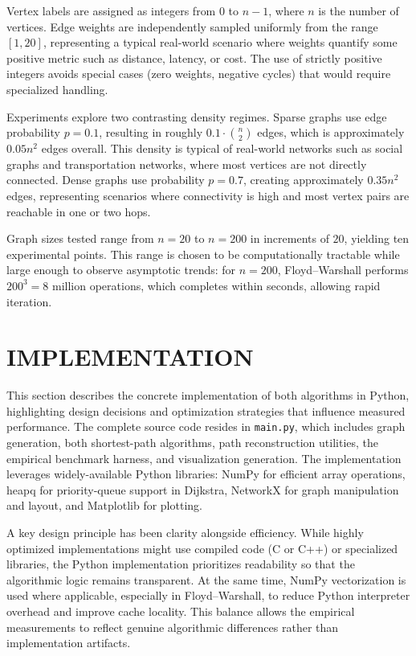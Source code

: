 \documentclass[12pt]{article}
\begin{document}
Vertex labels are assigned as integers from $0$ to $n-1$, where $n$ is the number of vertices. Edge weights
are independently sampled uniformly from the range $[1,20]$, representing a typical real-world scenario where
weights quantify some positive metric such as distance, latency, or cost. The use of strictly positive integers
avoids special cases (zero weights, negative cycles) that would require specialized handling.

Experiments explore two contrasting density regimes. Sparse graphs use edge probability $p=0.1$, resulting in
roughly $0.1 \cdot \binom{n}{2}$ edges, which is approximately $0.05 n^2$ edges overall. This density is
typical of real-world networks such as social graphs and transportation networks, where most vertices are
not directly connected. Dense graphs use probability $p=0.7$, creating approximately $0.35 n^2$ edges, representing
scenarios where connectivity is high and most vertex pairs are reachable in one or two hops.

Graph sizes tested range from $n=20$ to $n=200$ in increments of $20$, yielding ten experimental points. This
range is chosen to be computationally tractable while large enough to observe asymptotic trends: for $n=200$,
Floyd--Warshall performs $200^3 = 8$ million operations, which completes within seconds, allowing rapid iteration.

\newpage
{}
\section{IMPLEMENTATION}

This section describes the concrete implementation of both algorithms in Python, highlighting
design decisions and optimization strategies that influence measured performance. The complete source code
resides in \texttt{main.py}, which includes graph generation, both shortest-path algorithms, path reconstruction
utilities, the empirical benchmark harness, and visualization generation. The implementation leverages widely-available
Python libraries: NumPy for efficient array operations, heapq for priority-queue support in Dijkstra, NetworkX for
graph manipulation and layout, and Matplotlib for plotting.

A key design principle has been clarity alongside efficiency. While highly optimized implementations might use
compiled code (C or C++) or specialized libraries, the Python implementation prioritizes readability so that
the algorithmic logic remains transparent. At the same time, NumPy vectorization is used where applicable, especially
in Floyd--Warshall, to reduce Python interpreter overhead and improve cache locality. This balance allows the
empirical measurements to reflect genuine algorithmic differences rather than implementation artifacts.
\end{document}
